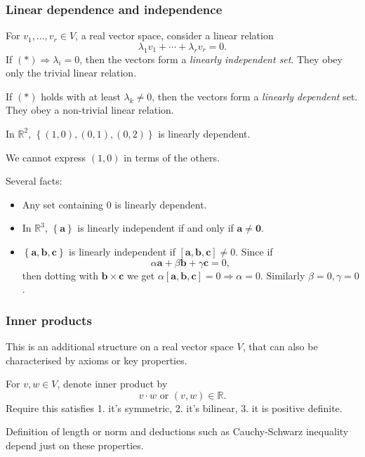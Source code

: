 \documentclass[a4paper]{article}
\newcommand{\bluecomment}[1]{{\color{blue}#1}}
\begin{document}
\subsubsection{Linear dependence and independence}
For $ v_1,\dots,v_r\in V $, a real vector space, consider a linear relation
\[
  \lambda_1 v_1+\cdots+\lambda_r v_r=0\tag{*}
.\]
If $ (*)\Rightarrow \lambda_i=0 $, then the vectors form a
\textit{linearly independent set}. They obey only the trivial linear relation.

If $ (*) $ holds with at least $ \lambda_k\neq 0 $, then the vectors
form a \textit{linearly dependent} set. They obey a non-trivial linear relation.
\begin{example}
  In $ \mathbb{R}^2 $, $ \left\{ (1,0),(0,1),(0,2)\right\} $ is
  linearly dependent.

  \bluecomment{We cannot express $(1,0)$ in terms of the others.}
\end{example}
Several facts:
\begin{itemize}
  \item Any set containing $0$ is linearly dependent.
  \item In $ \mathbb{R}^3 $, $ \left\{ \mathbf{a}\right\} $ is
    linearly independent if and only if $ \mathbf{a}\neq \mathbf{0} $.
  \item $ \left\{ \mathbf{a},\mathbf{b},\mathbf{c}\right\} $ is
    linearly independent if $ [\mathbf{a},\mathbf{b},\mathbf{c}]\neq
    0 $. Since if
    \[
      \alpha \mathbf{a}+\beta \mathbf{b}+\gamma \mathbf{c}=0
    ,\]
    then dotting with $ \mathbf{b}\times \mathbf{c} $ we get $
    \alpha[\mathbf{a},\mathbf{b},\mathbf{c}]=0 \Rightarrow \alpha=0
    $. Similarly $ \beta=0, \gamma=0 $.
\end{itemize}
\subsubsection{Inner products}
This is an additional structure on a real vector space $V$, that can
also be characterised by axioms or key properties.

For $v,w\in V$, denote inner product by
\[
  v\cdot w \text{  or  } (v,w)\in \mathbb{R}
.\]
Require this satisfies 1. it's symmetric, 2. it's bilinear, 3. it is
positive definite.

Definition of length or norm and deductions such as Cauchy-Schwarz
inequality depend just on these properties.
\end{document}
